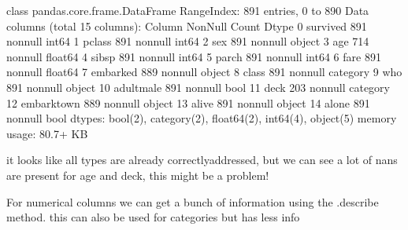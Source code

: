 \documentclass[letterpaper,10pt,english]{jupyterBook}
\begin{document}
\begin{sphinxVerbatim}[commandchars=\\\{\}]
\end{sphinxVerbatim}

\begin{sphinxVerbatim}[commandchars=\\\{\}]
\PYGZlt{}class \PYGZsq{}pandas.core.frame.DataFrame\PYGZsq{}\PYGZgt{}
RangeIndex: 891 entries, 0 to 890
Data columns (total 15 columns):
 \PYGZsh{}   Column       Non\PYGZhy{}Null Count  Dtype   
\PYGZhy{}\PYGZhy{}\PYGZhy{}  \PYGZhy{}\PYGZhy{}\PYGZhy{}\PYGZhy{}\PYGZhy{}\PYGZhy{}       \PYGZhy{}\PYGZhy{}\PYGZhy{}\PYGZhy{}\PYGZhy{}\PYGZhy{}\PYGZhy{}\PYGZhy{}\PYGZhy{}\PYGZhy{}\PYGZhy{}\PYGZhy{}\PYGZhy{}\PYGZhy{}  \PYGZhy{}\PYGZhy{}\PYGZhy{}\PYGZhy{}\PYGZhy{}   
 0   survived     891 non\PYGZhy{}null    int64   
 1   pclass       891 non\PYGZhy{}null    int64   
 2   sex          891 non\PYGZhy{}null    object  
 3   age          714 non\PYGZhy{}null    float64 
 4   sibsp        891 non\PYGZhy{}null    int64   
 5   parch        891 non\PYGZhy{}null    int64   
 6   fare         891 non\PYGZhy{}null    float64 
 7   embarked     889 non\PYGZhy{}null    object  
 8   class        891 non\PYGZhy{}null    category
 9   who          891 non\PYGZhy{}null    object  
 10  adult\PYGZus{}male   891 non\PYGZhy{}null    bool    
 11  deck         203 non\PYGZhy{}null    category
 12  embark\PYGZus{}town  889 non\PYGZhy{}null    object  
 13  alive        891 non\PYGZhy{}null    object  
 14  alone        891 non\PYGZhy{}null    bool    
dtypes: bool(2), category(2), float64(2), int64(4), object(5)
memory usage: 80.7+ KB
\end{sphinxVerbatim}

\sphinxAtStartPar
it looks like all types are already correctlyaddressed, but we can see a lot of nans are present for age and deck, this might be a problem!

\sphinxAtStartPar
For numerical columns we can get a bunch of information using the .describe method. this can also be used for categories but has less info

\begin{sphinxVerbatim}[commandchars=\\\{\}]
\end{sphinxVerbatim}
\end{document}

